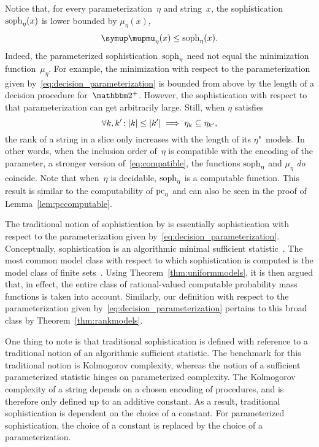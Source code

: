 Notice that, for every parameterization~$\eta$ and string~$x$, the sophistication $\operatorname{soph}_\eta(x)$ is lower bounded by $\mu_\eta(x)$,
\begin{equation*}
  \mu_\eta(x) \le \soph_\eta(x).
\end{equation*}
Indeed, the parameterized sophistication~$\operatorname{soph}_\eta$ need not equal the minimization function~$\mu_\eta$.
For example, the minimization with respect to the parameterization given by~\eqref{eq:decision_parameterization} is bounded from above by the length of a decision procedure for~$\binary^+$.
However, the sophistication with respect to that parameterization can get arbitrarily large.
Still, when $\eta$ satisfies
\begin{equation}
\label{eq:compatible_strong}
  \forall k, k'\colon {\lvert k\rvert} \le {\lvert k'\rvert} \implies \eta_k \subseteq \eta_{k'},
\end{equation}
the rank of a string in a slice only increases with the length of its $\eta$"~models.
In other words, when the inclusion order of~$\eta$ is compatible with the encoding of the parameter, a stronger version of~\eqref{eq:compatible}, the functions $\operatorname{soph}_\eta$ and $\mu_\eta$ \emph{do} coincide.
Note that when~$\eta$ is decidable, $\operatorname{soph}_\eta$ is a computable function.
This result is similar to the computability of $\operatorname{pc}_\eta$ and can also be seen in the proof of Lemma~\ref{lem:pccomputable}.

\begin{example}
  The traditional notion of sophistication by \textcite{koppel1988structure} is essentially sophistication with respect to the parameterization given by~\eqref{eq:decision_parameterization}.
  Conceptually, sophistication is an algorithmic minimal sufficient statistic~\parencite{gacs2001algorithmic,vereshchagin2004kolmogorov}.
  The most common model class with respect to which sophistication is computed is the model class of finite sets~\parencite{bloem2015two}.
  Using Theorem~\ref{thm:uniformmodels}, it is then argued that, in effect, the entire class of rational-valued computable probability mass functions is taken into account.
  Similarly, our definition with respect to the parameterization given by~\eqref{eq:decision_parameterization} pertains to this broad class by Theorem~\ref{thm:rankmodels}.

  One thing to note is that traditional sophistication is defined with reference to a traditional notion of an algorithmic sufficient statistic.
  The benchmark for this traditional notion is Kolmogorov complexity, whereas the notion of a sufficient parameterized statistic hinges on parameterized complexity.
  The Kolmogorov complexity of a string depends on a chosen encoding of procedures, and is therefore only defined up to an additive constant.
  As a result, traditional sophistication is dependent on the choice of a constant.
  For parameterized sophistication, the choice of a constant is replaced by the choice of a parameterization.
\end{example}


